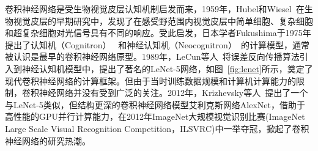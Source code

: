 

卷积神经网络是受生物视觉皮层认知机制启发而来，1959年，Hubel和Wiesel~\cite{hubel1959receptive,hubel1962receptive}在生物视觉皮层的早期研究中，发现了在感受野范围内视觉皮层中简单细胞、复杂细胞和超复杂细胞对光信号具有不同的响应。受此启发，日本学者Fukushima于1975年提出了认知机（Cognitron）~\cite{fukushima1975cognitron} 和神经认知机（Neocognitron）~\cite{fukushima1980neocognitron}的计算模型，通常被认识是最早的卷积神经网络原型。1989年，LeCun等人~\cite{lecun1989backpropagation,le1990handwritten}将误差反向传播算法引入到神经认知机模型中，提出了著名的LeNet-5网络，如图~\ref{fig:lenet}所示，奠定了现代卷积神经网络的计算框架。但由于当时训练数据规模和计算机计算能力的限制，卷积神经网络并没有受到广泛的关注。2012年，Krizhevsky等人~\cite{krizhevsky2012imagenet}提出了一个与LeNet-5类似，但结构更深的卷积神经网络模型艾利克斯网络AlexNet，借助于高性能的GPU并行计算能力，在2012年ImageNet大规模视觉识别比赛(ImageNet Large Scale Visual Recognition Competition，ILSVRC)中一举夺冠，掀起了卷积神经网络的研究热潮。

